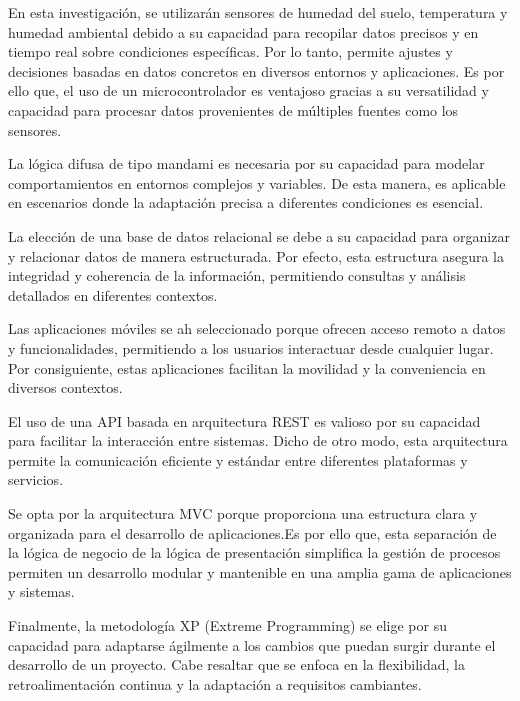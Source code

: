 
En esta investigación, se utilizarán sensores de humedad del suelo, temperatura
y humedad ambiental debido a su capacidad para recopilar datos precisos y en
tiempo real sobre condiciones específicas. Por lo tanto, permite ajustes y
decisiones basadas en datos concretos en diversos entornos y aplicaciones. Es
por ello que, el uso de un microcontrolador es ventajoso gracias a su
versatilidad y capacidad para procesar datos provenientes de múltiples fuentes
como los sensores.

\bigbreak
La lógica difusa de tipo mandami es necesaria por su capacidad para modelar comportamientos en entornos complejos y variables. De esta manera, es aplicable en escenarios donde la adaptación precisa a diferentes condiciones es esencial.

\bigbreak
La elección de una base de datos relacional se debe a su capacidad para organizar y relacionar datos de manera estructurada. Por efecto, esta estructura asegura la integridad y coherencia de la información, permitiendo consultas y análisis detallados en diferentes contextos.

\bigbreak
Las aplicaciones móviles se ah seleccionado porque ofrecen acceso remoto a datos y funcionalidades, permitiendo a los usuarios interactuar desde cualquier lugar. Por consiguiente, estas aplicaciones facilitan la movilidad y la conveniencia en diversos contextos.

\bigbreak
El uso de una API basada en arquitectura REST es valioso por su capacidad para facilitar la interacción entre sistemas. Dicho de otro modo, esta arquitectura permite la comunicación eficiente y estándar entre diferentes plataformas y servicios.

\bigbreak
Se opta por la arquitectura MVC porque proporciona una estructura clara y organizada para el desarrollo de aplicaciones.Es por ello que, esta separación de la lógica de negocio de la lógica de presentación simplifica la gestión de procesos permiten un desarrollo modular y mantenible en una amplia gama de aplicaciones y sistemas.

\bigbreak
Finalmente, la metodología XP (Extreme Programming) se elige por su capacidad para adaptarse ágilmente a los cambios que puedan surgir durante el desarrollo de un proyecto. Cabe resaltar que se enfoca en la flexibilidad, la retroalimentación continua y la adaptación a requisitos cambiantes.


